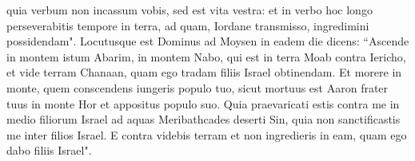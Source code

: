 \begin{biblechapter}
\verse quia verbum non incassum vobis, sed est vita vestra: et in verbo hoc longo perseverabitis tempore in terra, ad quam, Iordane transmisso, ingredimini possidendam". 
\verse Locutusque est Dominus ad Moysen in eadem die dicens: 
\verse “Ascende in montem istum Abarim, in montem Nabo, qui est in terra Moab contra Iericho, et vide terram Chanaan, quam ego tradam filiis Israel obtinendam. 
\verse Et morere in monte, quem conscendens iungeris populo tuo, sicut mortuus est Aaron frater tuus in monte Hor et appositus populo suo. 
\verse Quia praevaricati estis contra me in medio filiorum Israel ad aquas Meribathcades deserti Sin, quia non sanctificastis me inter filios Israel. 
\verse E contra videbis terram et non ingredieris in eam, quam ego dabo filiis Israel". 
\end{biblechapter}

